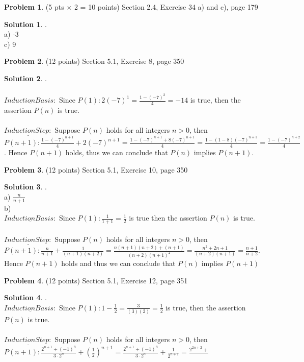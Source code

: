 \documentclass{article}
\theoremstyle{definition}
\newtheorem{problem}{Problem}
\newtheorem*{solution}{Solution}
\begin{document}
\begin{problem} (5 pts $\times$ 2 = 10 points) 
Section 2.4, Exercise 34 a) and c), page 179
\end{problem}
\begin{solution}.
\\a) -3
\\c) 9
\end{solution}

\begin{problem} (12 points) 
Section 5.1, Exercise 8, page 350
\end{problem}
\begin{solution}.
\\\\$\underline{Induction Basis:}$ Since $P(1): 2(-7)^1 = \frac{1 - (-7)^2}{4} = -14$ is true, then the assertion $P(n)$ is true.
\\\\$\underline{Induction Step:}$ Suppose $P(n)$ holds for all integers $n>0$, then $P(n+1): \frac{1 - (-7)^{n+1}}{4} + 2(-7)^{n+1} = \frac{1 - (-7)^{n+1} + 8(-7)^{n+1}}{4} = \frac{1 - (1-8)(-7)^{n+1}}{4} = \frac{1 - (-7)^{n+2}}{4}$. Hence $P(n+1)$ holds, thus we can conclude that $P(n)$ implies $P(n+1).$
\end{solution}

\begin{problem} (12 points) 
Section 5.1, Exercise 10, page 350
\end{problem}
\begin{solution}.
\\a) $\frac{n}{n+1}$
\\b) \\$\underline{Induction Basis:}$ Since $P(1): \frac{1}{1+1} = \frac{1}{2}$ is true then the assertion $P(n)$ is true.
\\\\$\underline{Induction Step:}$ Suppose $P(n)$ holds for all integers $n>0$, then \\$P(n+1): \frac{n}{n+1} + \frac{1}{(n+1)(n+2)} = \frac{n(n+1)(n+2)+(n+1)}{(n+2)(n+1)^2} = \frac{n^2+2n+1}{(n+2)(n+1)} = \frac{n+1}{n+2}$. \\Hence $P(n+1)$ holds and thus we can conclude that $P(n)$ implies $P(n+1)$
\end{solution}

\begin{problem} (12 points) 
Section 5.1, Exercise 12, page 351
\end{problem}
\begin{solution}.
\\$\underline{Induction Basis:}$ Since $P(1): 1 - \frac{1}{2} = \frac{3}{(3)(2)} = \frac{1}{2}$ is true, then the assertion $P(n)$ is true.
\\\\$\underline{Induction Step:}$ Suppose $P(n)$ holds for all integers $n>0$, then \\$P(n+1): \frac{2^{n+1}+(-1)^n}{3\cdot2^n} + (\frac{1}{2})^{n+1} = \frac{2^{n+1}+(-1)^n}{3\cdot2^n} + \frac{1}{2^{n+1}} = \frac{2^{2n+2}+}{}$
\end{solution}
\end{document}
